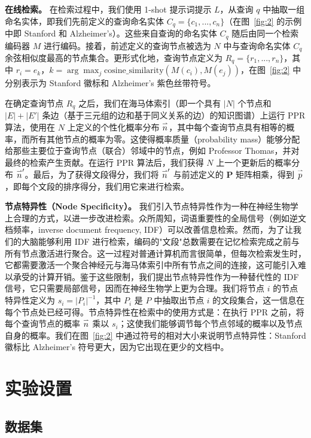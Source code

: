 \documentclass[11pt,UTF8,fontset=fandol]{ctexart}
\newcommand{\vecn}{\overset{\text{\tiny$\rightharpoonup$}}{n}}
\begin{document}
\textbf{在线检索。} 在检索过程中，我们使用 1-shot 提示词提示 $L$，从查询 $q$ 中抽取一组命名实体，即我们先前定义的查询命名实体 $C_q = \{c_1, ..., c_n\}$（在图~\ref{fig:2} 的示例中即 Stanford 和 Alzheimer's）。这些来自查询的命名实体 $C_q$ 随后由同一个检索编码器 $M$ 进行编码。接着，前述定义的查询节点被选为 $N$ 中与查询命名实体 $C_q$ 余弦相似度最高的节点集合。更形式化地，查询节点定义为 $R_q = \{r_1, ..., r_n\}$，其中 $r_i = e_k$，$k = \arg\max_j \mathrm{cosine\_similarity}(M(c_i), M(e_j))$，在图~\ref{fig:2} 中分别表示为 Stanford 徽标和 Alzheimer's 紫色丝带符号。

在确定查询节点 $R_q$ 之后，我们在海马体索引（即一个具有 $|N|$ 个节点和 $|E| + |E'|$ 条边（基于三元组的边和基于同义关系的边）的知识图谱）上运行 PPR 算法，使用在 $N$ 上定义的个性化概率分布 $\vecn$，其中每个查询节点具有相等的概率，而所有其他节点的概率为零。这使得概率质量（probability mass）能够分配给那些主要位于查询节点（联合）邻域中的节点，例如 Professor Thomas，并对最终的检索产生贡献。在运行 PPR 算法后，我们获得 $N$ 上一个更新后的概率分布 $\vecn'$。最后，为了获得文段得分，我们将 $\vecn'$ 与前述定义的 $\mathbf{P}$ 矩阵相乘，得到 $\overset{\text{\tiny$\rightharpoonup$}}{p}$，即每个文段的排序得分，我们用它来进行检索。

\textbf{节点特异性（Node Specificity）。} 我们引入节点特异性作为一种在神经生物学上合理的方式，以进一步改进检索。众所周知，词语重要性的全局信号（例如逆文档频率，inverse document frequency, IDF）可以改善信息检索。然而，为了让我们的大脑能够利用 IDF 进行检索，编码的"文段"总数需要在记忆检索完成之前与所有节点激活进行聚合。这一过程对普通计算机而言很简单，但每次检索发生时，它都需要激活一个聚合神经元与海马体索引中所有节点之间的连接，这可能引入难以承受的计算开销。鉴于这些限制，我们提出节点特异性作为一种替代性的 IDF 信号，它只需要局部信号，因而在神经生物学上更为合理。我们将节点 $i$ 的节点特异性定义为 $s_i = |P_i|^{-1}$，其中 $P_i$ 是 $P$ 中抽取出节点 $i$ 的文段集合，这一信息在每个节点处已经可得。节点特异性在检索中的使用方式是：在执行 PPR 之前，将每个查询节点的概率 $\vecn$ 乘以 $s_i$；这使我们能够调节每个节点邻域的概率以及节点自身的概率。我们在图~\ref{fig:2} 中通过符号的相对大小来说明节点特异性：Stanford 徽标比 Alzheimer's 符号更大，因为它出现在更少的文档中。

\section{实验设置}
\subsection{数据集}
\end{document}
